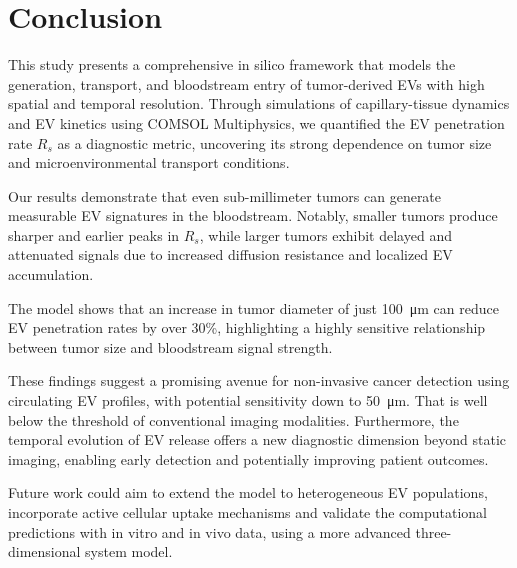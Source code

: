 \documentclass[sigconf]{acmart}
\begin{document}
\section{Conclusion}
\label{sec: conclusion}
This study presents a comprehensive in silico framework that models the generation, transport, and bloodstream entry of tumor-derived EVs with high spatial and temporal resolution. Through simulations of capillary-tissue dynamics and EV kinetics using COMSOL Multiphysics, we quantified the EV penetration rate $R_s$ as a diagnostic metric, uncovering its strong dependence on tumor size and microenvironmental transport conditions.

Our results demonstrate that even sub-millimeter tumors can generate measurable EV signatures in the bloodstream. Notably, smaller tumors produce sharper and earlier peaks in $R_s$, while larger tumors exhibit delayed and attenuated signals due to increased diffusion resistance and localized EV accumulation. 

The model shows that an increase in tumor diameter of just 100~\si{\micro\meter} can reduce EV penetration rates by over 30\%, highlighting a highly sensitive relationship between tumor size and bloodstream signal strength.

These findings suggest a promising avenue for non-invasive cancer detection using circulating EV profiles, with potential sensitivity down to 50~\si{\micro\meter}. That is well below the threshold of conventional imaging modalities. Furthermore, the temporal evolution of EV release offers a new diagnostic dimension beyond static imaging, enabling early detection and potentially improving patient outcomes.

Future work could aim to extend the model to heterogeneous EV populations, incorporate active cellular uptake mechanisms and validate the computational predictions with in vitro and in vivo data, using a more advanced three-dimensional system model.



\end{document}
